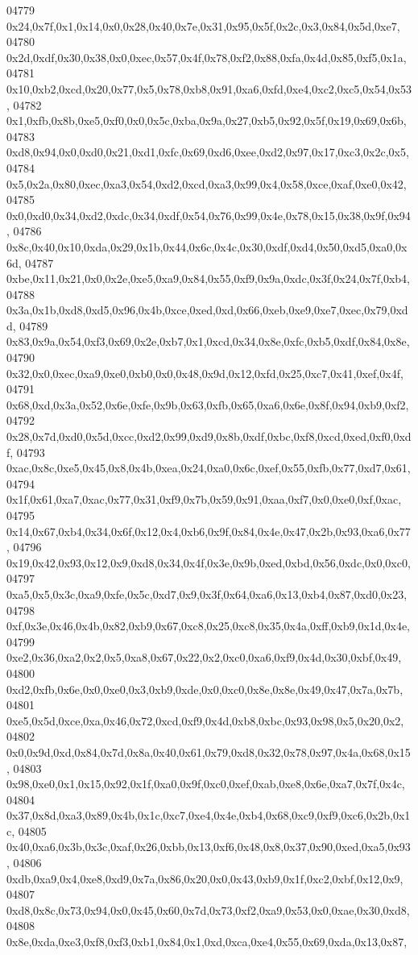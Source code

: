 \begin{DoxyCode}
04779   0x24,0x7f,0x1,0x14,0x0,0x28,0x40,0x7e,0x31,0x95,0x5f,0x2c,0x3,0x84,0x5d,0xe7,
04780   0x2d,0xdf,0x30,0x38,0x0,0xec,0x57,0x4f,0x78,0xf2,0x88,0xfa,0x4d,0x85,0xf5,0x1a,
04781   0x10,0xb2,0xcd,0x20,0x77,0x5,0x78,0xb8,0x91,0xa6,0xfd,0xe4,0xc2,0xc5,0x54,0x53,
04782   0x1,0xfb,0x8b,0xe5,0xf0,0x0,0x5c,0xba,0x9a,0x27,0xb5,0x92,0x5f,0x19,0x69,0x6b,
04783   0xd8,0x94,0x0,0xd0,0x21,0xd1,0xfc,0x69,0xd6,0xee,0xd2,0x97,0x17,0xc3,0x2c,0x5,
04784   0x5,0x2a,0x80,0xec,0xa3,0x54,0xd2,0xcd,0xa3,0x99,0x4,0x58,0xce,0xaf,0xe0,0x42,
04785   0x0,0xd0,0x34,0xd2,0xdc,0x34,0xdf,0x54,0x76,0x99,0x4e,0x78,0x15,0x38,0x9f,0x94,
04786   0x8c,0x40,0x10,0xda,0x29,0x1b,0x44,0x6c,0x4c,0x30,0xdf,0xd4,0x50,0xd5,0xa0,0x6d,
04787   0xbe,0x11,0x21,0x0,0x2e,0xe5,0xa9,0x84,0x55,0xf9,0x9a,0xdc,0x3f,0x24,0x7f,0xb4,
04788   0x3a,0x1b,0xd8,0xd5,0x96,0x4b,0xce,0xed,0xd,0x66,0xeb,0xe9,0xe7,0xec,0x79,0xdd,
04789   0x83,0x9a,0x54,0xf3,0x69,0x2e,0xb7,0x1,0xcd,0x34,0x8e,0xfc,0xb5,0xdf,0x84,0x8e,
04790   0x32,0x0,0xec,0xa9,0xe0,0xb0,0x0,0x48,0x9d,0x12,0xfd,0x25,0xc7,0x41,0xef,0x4f,
04791   0x68,0xd,0x3a,0x52,0x6e,0xfe,0x9b,0x63,0xfb,0x65,0xa6,0x6e,0x8f,0x94,0xb9,0xf2,
04792   0x28,0x7d,0xd0,0x5d,0xcc,0xd2,0x99,0xd9,0x8b,0xdf,0xbc,0xf8,0xcd,0xed,0xf0,0xdf,
04793   0xac,0x8c,0xe5,0x45,0x8,0x4b,0xea,0x24,0xa0,0x6c,0xef,0x55,0xfb,0x77,0xd7,0x61,
04794   0x1f,0x61,0xa7,0xac,0x77,0x31,0xf9,0x7b,0x59,0x91,0xaa,0xf7,0x0,0xe0,0xf,0xac,
04795   0x14,0x67,0xb4,0x34,0x6f,0x12,0x4,0xb6,0x9f,0x84,0x4e,0x47,0x2b,0x93,0xa6,0x77,
04796   0x19,0x42,0x93,0x12,0x9,0xd8,0x34,0x4f,0x3e,0x9b,0xed,0xbd,0x56,0xdc,0x0,0xc0,
04797   0xa5,0x5,0x3c,0xa9,0xfe,0x5c,0xd7,0x9,0x3f,0x64,0xa6,0x13,0xb4,0x87,0xd0,0x23,
04798   0xf,0x3e,0x46,0x4b,0x82,0xb9,0x67,0xc8,0x25,0xc8,0x35,0x4a,0xff,0xb9,0x1d,0x4e,
04799   0xe2,0x36,0xa2,0x2,0x5,0xa8,0x67,0x22,0x2,0xc0,0xa6,0xf9,0x4d,0x30,0xbf,0x49,
04800   0xd2,0xfb,0x6e,0x0,0xe0,0x3,0xb9,0xde,0x0,0xc0,0x8e,0x8e,0x49,0x47,0x7a,0x7b,
04801   0xe5,0x5d,0xce,0xa,0x46,0x72,0xcd,0xf9,0x4d,0xb8,0xbc,0x93,0x98,0x5,0x20,0x2,
04802   0x0,0x9d,0xd,0x84,0x7d,0x8a,0x40,0x61,0x79,0xd8,0x32,0x78,0x97,0x4a,0x68,0x15,
04803   0x98,0xe0,0x1,0x15,0x92,0x1f,0xa0,0x9f,0xc0,0xef,0xab,0xe8,0x6e,0xa7,0x7f,0x4c,
04804   0x37,0x8d,0xa3,0x89,0x4b,0x1c,0xc7,0xe4,0x4e,0xb4,0x68,0xc9,0xf9,0xc6,0x2b,0x1c,
04805   0x40,0xa6,0x3b,0x3c,0xaf,0x26,0xbb,0x13,0xf6,0x48,0x8,0x37,0x90,0xed,0xa5,0x93,
04806   0xdb,0xa9,0x4,0xe8,0xd9,0x7a,0x86,0x20,0x0,0x43,0xb9,0x1f,0xc2,0xbf,0x12,0x9,
04807   0xd8,0x8c,0x73,0x94,0x0,0x45,0x60,0x7d,0x73,0xf2,0xa9,0x53,0x0,0xae,0x30,0xd8,
04808   0x8e,0xda,0xe3,0xf8,0xf3,0xb1,0x84,0x1,0xd,0xca,0xe4,0x55,0x69,0xda,0x13,0x87,

\end{DoxyCode}
